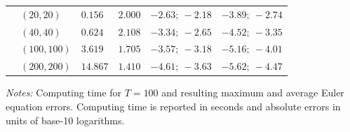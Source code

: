 \documentclass[a4paper,12pt]{article}
\begin{document}
\begin{table}[htbp]
\begin{threeparttable}
\begin{tabular}{L{0.1cm}C{2.5cm}C{2cm}C{2cm}C{3cm}C{3cm}}
		& $\left(  20,20  \right)$ &  $0.156$ & $2.000$ & $-2.63;\ -2.18$ & $-3.89;\ -2.74$ \\
		& $\left(  40,40  \right)$ &  $0.624$ & $2.108$ & $-3.34;\ -2.65$ & $-4.52;\ -3.35$ \\
		& $\left( 100,100 \right)$ &  $3.619$ & $1.705$ & $-3.57;\ -3.18$ & $-5.16;\ -4.01$ \\
		& $\left( 200,200 \right)$ & $14.867$ & $1.410$ & $-4.61;\ -3.63$ & $-5.62;\ -4.47$ \\
		\bottomrule
	\end{tabular}
	\begin{tablenotes}
		\footnotesize
		\emph{Notes:} Computing time for $T=100$ and resulting maximum and average Euler equation errors. Computing time is reported in seconds and absolute errors in units of base-10 logarithms.
	\end{tablenotes}
\end{threeparttable}
\end{table}
\end{document}
